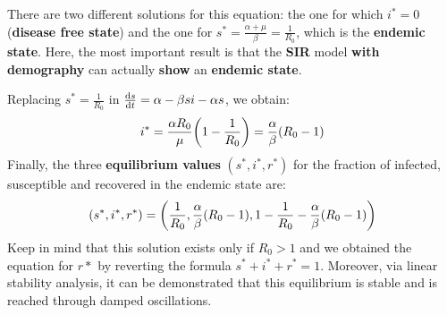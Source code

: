 \documentclass[../main/main.tex]{subfiles}
\begin{document}
There are two different solutions for this equation: the one for which \( i^* = 0 \) (\textbf{disease free state}) and the one for \( s^* = \frac{\alpha + \mu }{\beta } = \frac{1}{R_0} \), which is the \textbf{endemic state}. Here, the most important result is that the \textbf{SIR} model \textbf{with demography} can actually \textbf{show} an \textbf{endemic state}.

Replacing \( s^* = \frac{1}{R_0} \) in \( \dv{s}{t} = \alpha - \beta s i - \alpha s  \), we obtain:
\begin{equation*}
  i^* = \frac{\alpha R_0 }{\mu } \qty(1 - \frac{1}{R_0}) = \frac{\alpha }{\beta } (R_0 -1)
\end{equation*}
Finally, the three \textbf{equilibrium values} $(s^*, i^*, r^*)$ for the fraction of infected, susceptible and recovered in the endemic state are:
\begin{equation}
  (s^*, i^*, r^*) = \qty( \frac{1}{R_0}, \frac{\alpha }{\beta } (R_0 -1 ), 1- \frac{1}{R_0} - \frac{\alpha }{\beta } (R_0-1))
\end{equation}
Keep in mind that this solution exists only if \( R_0>1 \) and we obtained the equation for $r*$ by reverting the formula $s^* +  i^* + r^* = 1$. Moreover, via linear stability analysis, it can be demonstrated that this equilibrium is stable and is reached through damped oscillations.
\end{document}
